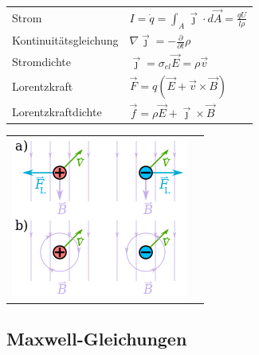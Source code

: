 \documentclass[12pt,a4paper]{article}
\newcommand{\pd}[2]{\frac{\partial #1}{\partial #2}}
\renewcommand{\=}[1]{\stackrel{#1}{=}}
\theoremstyle{definition}
\theoremstyle{remark}
\begin{document}
\begin{center}
\begin{minipage}[t]{.5\linewidth}
\vspace{0pt}
\noindent\begin{tabular}{ll}
Strom & $I = \dot{q} = \int_A \vec{\jmath} \cdot d\vec{A} = \frac{q U}{l \rho}$\\
Kontinuitätsgleichung & $\nabla \vec{\jmath} = -\pd{}{t} \rho$\\
Stromdichte & $\vec{\jmath} = \sigma_{el} \vec{E} = \rho \vec{v}$\\
Lorentzkraft & $\vec F = q(\vec E + \vec v \times \vec B)$\\
Lorentzkraftdichte & $\vec f = \rho \vec E + \vec \jmath \times \vec B$\\
\end{tabular}
\end{minipage}%
\begin{minipage}[t]{.5\linewidth}
\vspace{0pt}
\begin{tabular}{ll}
\includegraphics[width=\linewidth]{pic/lorentzkraft.png}
\end{tabular}
\end{minipage}
\end{center}

\subsection{Maxwell-Gleichungen}
\end{document}
